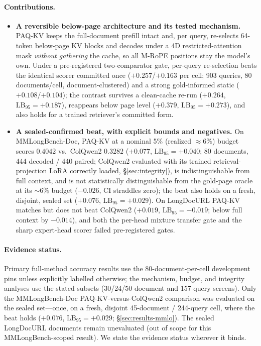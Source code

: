 \documentclass[letterpaper]{article} %
\newcommand{\paqc}{\textsc{PAQ-KV}}
\newcommand{\lb}{\mathrm{LB}_{95}}
\begin{document}
\paragraph{Contributions.}
\begin{itemize}
\item \textbf{A reversible below-page architecture and its tested mechanism.} \paqc{} keeps the full-document prefill intact and, per query, re-selects 64-token below-page KV blocks and decodes under a 4D restricted-attention mask \emph{without gathering} the cache, so all M-RoPE positions stay the model's own. Under a pre-registered two-comparator gate, per-query re-selection beats the identical scorer committed once ($+0.257$/$+0.163$ per cell; 903 queries, 80 documents/cell, document-clustered) and a strong gold-informed static ($+0.108$/$+0.104$); the contrast survives a clean-cache re-run ($+0.264$, $\lb=+0.187$), reappears below page level ($+0.379$, $\lb=+0.273$), and also holds for a trained retriever's committed form.
\item \textbf{A sealed-confirmed beat, with explicit bounds and negatives.} On MMLongBench-Doc, \paqc{} at a nominal 5\% (realized ${\approx}6\%$) budget scores $0.4042$ vs.\ ColQwen2 $0.3282$ ($+0.077$, $\lb=+0.040$; 80 documents, 444 decoded / 440 paired; ColQwen2 evaluated with its trained retrieval-projection LoRA correctly loaded, \S\ref{sec:integrity}), is indistinguishable from full context, and is not statistically distinguishable from the gold-page oracle at its ${\sim}6\%$ budget ($-0.026$, CI straddles zero); the beat also holds on a fresh, disjoint, sealed set ($+0.076$, $\lb=+0.029$). On LongDocURL \paqc{} matches but does not beat ColQwen2 ($+0.019$, $\lb=-0.019$; below full context by $-0.014$), and both the per-head mixture transfer gate and the sharp expert-head scorer failed pre-registered gates.
\end{itemize}

\paragraph{Evidence status.} Primary full-method accuracy results use the 80-document-per-cell development pins unless explicitly labelled otherwise; the mechanism, budget, and integrity analyses use the stated subsets (30/24/50-document and 157-query screens). Only the MMLongBench-Doc \paqc{}-versus-ColQwen2 comparison was evaluated on the sealed set---once, on a fresh, disjoint 45-document / 244-query cell, where the beat holds ($+0.076$, $\lb=+0.029$; \S\ref{sec:results-mmlo}). The sealed LongDocURL documents remain unevaluated (out of scope for this MMLongBench-scoped result). We state the evidence status wherever it binds.
\end{document}
